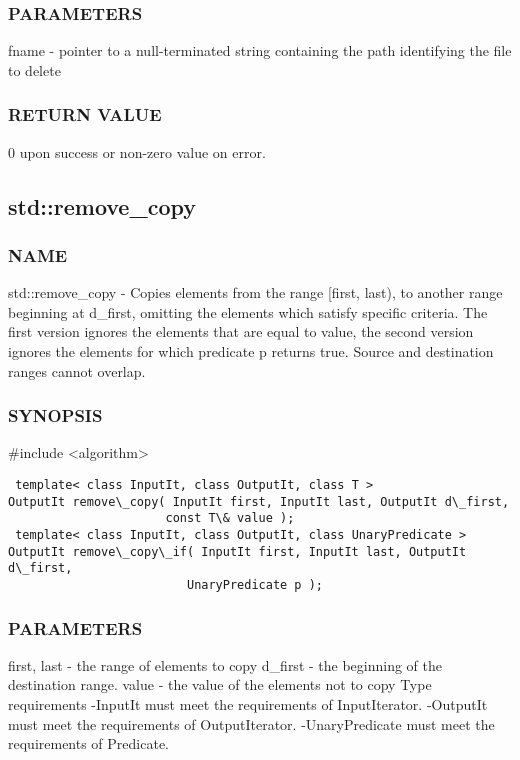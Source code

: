 \subsubsection{PARAMETERS}
fname - pointer to a null-terminated string containing the path identifying the file to delete

\subsubsection{RETURN VALUE}
0 upon success or non-zero value on error.



\subsection{std::remove\_copy}

\subsubsection{NAME}
std::remove\_copy - Copies elements from the range [first, last), to another range beginning at d\_first, omitting the elements which satisfy specific criteria. The first version ignores the elements that are equal to value, the second version ignores the elements for which predicate p returns true. Source and destination ranges cannot overlap.

\subsubsection{SYNOPSIS}
\#include <algorithm>

\begin{lstlisting}
 template< class InputIt, class OutputIt, class T >
OutputIt remove\_copy( InputIt first, InputIt last, OutputIt d\_first,
                      const T\& value );
 template< class InputIt, class OutputIt, class UnaryPredicate >
OutputIt remove\_copy\_if( InputIt first, InputIt last, OutputIt d\_first,
                         UnaryPredicate p );
\end{lstlisting}

\subsubsection{PARAMETERS}
first, last - the range of elements to copy
d\_first - the beginning of the destination range.
value - the value of the elements not to copy
 Type requirements
 -InputIt must meet the requirements of InputIterator.
 -OutputIt must meet the requirements of OutputIterator.
 -UnaryPredicate must meet the requirements of Predicate.

